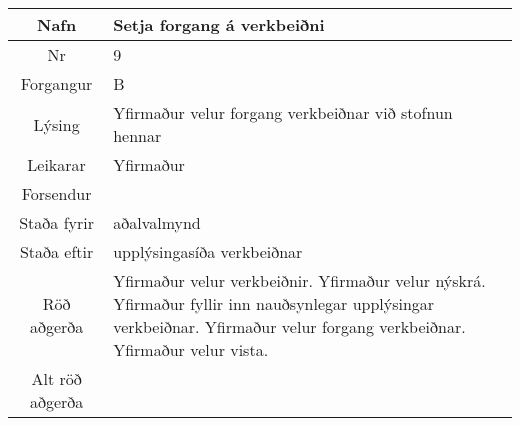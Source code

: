 \documentclass[a4paper]{article}
\begin{document}
\begin{tabular}{|c|p{10cm}|}
\hline
Nafn&Setja forgang á verkbeiðni\\
\hline
Nr&9\\
\hline
Forgangur&B\\
\hline
Lýsing&Yfirmaður velur forgang verkbeiðnar við stofnun hennar\\
\hline
Leikarar&Yfirmaður\\
\hline
Forsendur&\\
\hline
Staða fyrir&aðalvalmynd\\
\hline
Staða eftir&upplýsingasíða verkbeiðnar\\
\hline
Röð aðgerða&Yfirmaður velur verkbeiðnir. Yfirmaður velur nýskrá. Yfirmaður fyllir inn nauðsynlegar upplýsingar verkbeiðnar. Yfirmaður velur forgang verkbeiðnar. Yfirmaður velur vista.\\
\hline
Alt röð aðgerða&\\
\hline
\end{tabular}
\end{document}
